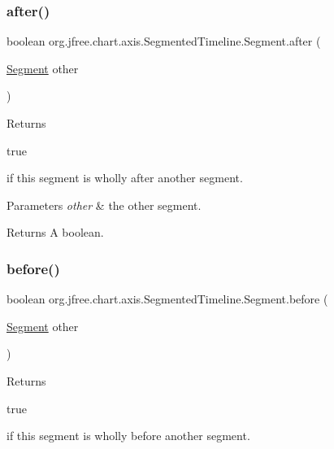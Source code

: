 \subsubsection{\texorpdfstring{after()}{after()}}
{\footnotesize\ttfamily boolean org.\+jfree.\+chart.\+axis.\+Segmented\+Timeline.\+Segment.\+after (\begin{DoxyParamCaption}\item[{\mbox{\hyperlink{classorg_1_1jfree_1_1chart_1_1axis_1_1_segmented_timeline_1_1_segment}{Segment}}}]{other }\end{DoxyParamCaption})}

Returns
\begin{DoxyCode}
\textcolor{keyword}{true} 
\end{DoxyCode}
 if this segment is wholly after another segment.


\begin{DoxyParams}{Parameters}
{\em other} & the other segment.\\
\hline
\end{DoxyParams}
\begin{DoxyReturn}{Returns}
A boolean. 
\end{DoxyReturn}
\mbox{\label{classorg_1_1jfree_1_1chart_1_1axis_1_1_segmented_timeline_1_1_segment_a70950cb34d719b3784b11768c850a917}} 
\subsubsection{\texorpdfstring{before()}{before()}}
{\footnotesize\ttfamily boolean org.\+jfree.\+chart.\+axis.\+Segmented\+Timeline.\+Segment.\+before (\begin{DoxyParamCaption}\item[{\mbox{\hyperlink{classorg_1_1jfree_1_1chart_1_1axis_1_1_segmented_timeline_1_1_segment}{Segment}}}]{other }\end{DoxyParamCaption})}

Returns
\begin{DoxyCode}
\textcolor{keyword}{true} 
\end{DoxyCode}
 if this segment is wholly before another segment.


